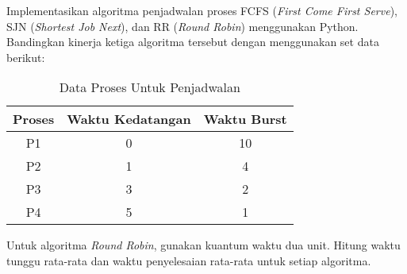 \documentclass[12pt]{article}
\begin{document}
Implementasikan algoritma penjadwalan proses FCFS (\textit{First Come First Serve}), SJN (\textit{Shortest Job Next}), dan RR (\textit{Round Robin}) menggunakan Python. Bandingkan kinerja ketiga algoritma tersebut dengan menggunakan set data berikut:
    \begin{table}[h] %
        \centering
        \begin{tabular}{|c|c|c|} %
        \hline
        Proses & Waktu Kedatangan & Waktu Burst \\ %
        \hline
        P1 & 0 & 10 \\ %
        \hline
        P2 & 1 & 4 \\ %
        \hline
        P3 & 3 & 2 \\
        \hline
        P4 & 5 & 1 \\
        \hline
        \end{tabular}
        \caption{Data Proses Untuk Penjadwalan} %
        \label{tab:Data Proses Untuk Penjadwalan} %
    \end{table}

Untuk algoritma \textit{Round Robin}, gunakan kuantum waktu dua unit. Hitung waktu tunggu rata-rata dan waktu penyelesaian rata-rata untuk setiap algoritma.
\end{document}
